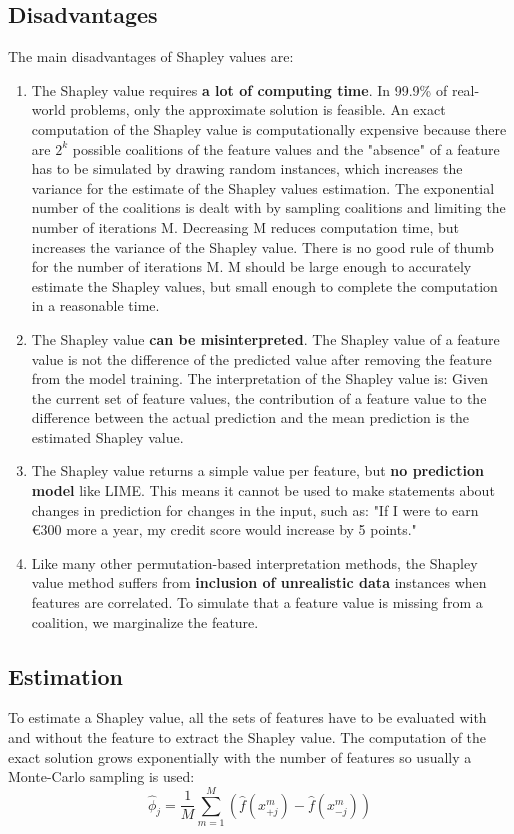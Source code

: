 \subsection{Disadvantages}
The main disadvantages of Shapley values are:
\begin{enumerate}
    \item The Shapley value requires \textbf{a lot of computing time}. In 99.9\% of real-world problems, only the approximate solution is feasible. An exact computation of the Shapley value is computationally expensive because there are $2^k$  possible coalitions of the feature values and the "absence" of a feature has to be simulated by drawing random instances, which increases the variance for the estimate of the Shapley values estimation. The exponential number of the coalitions is dealt with by sampling coalitions and limiting the number of iterations M. Decreasing M reduces computation time, but increases the variance of the Shapley value. There is no good rule of thumb for the number of iterations M. M should be large enough to accurately estimate the Shapley values, but small enough to complete the computation in a reasonable time.
    \item The Shapley value \textbf{can be misinterpreted}. The Shapley value of a feature value is not the difference of the predicted value after removing the feature from the model training. The interpretation of the Shapley value is: Given the current set of feature values, the contribution of a feature value to the difference between the actual prediction and the mean prediction is the estimated Shapley value.
    \item The Shapley value returns a simple value per feature, but \textbf{no prediction model} like LIME. This means it cannot be used to make statements about changes in prediction for changes in the input, such as: "If I were to earn €300 more a year, my credit score would increase by 5 points."
    \item Like many other permutation-based interpretation methods, the Shapley value method suffers from \textbf{inclusion of unrealistic data} instances when features are correlated. To simulate that a feature value is missing from a coalition, we marginalize the feature.
\end{enumerate}

\subsection{Estimation}
To estimate a Shapley value, all the sets of features have to be evaluated with and without the feature to extract the Shapley value. The computation of the exact solution grows exponentially with the number of features so usually a Monte-Carlo sampling is used:
\begin{equation}\label{eqn:estimation_formula}
\hat{\phi}_{j}=\frac{1}{M}\sum_{m=1}^M\left(\hat{f}(x^{m}_{+j})-\hat{f}(x^{m}_{-j})\right)
\end{equation}




